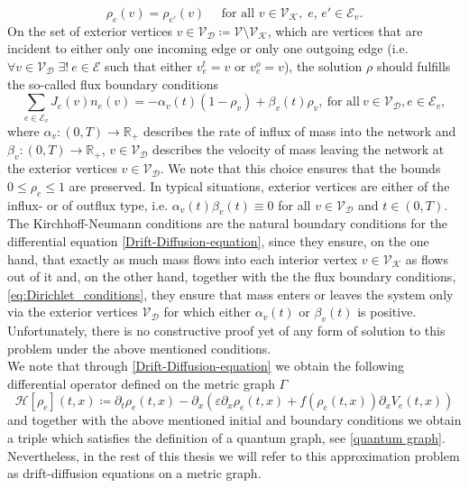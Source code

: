 \begin{equation}
    \label{continuous on vertices}
    \rho_e(v) = \rho_{e'}(v) \quad \text{ for all }v \in \mathcal{V}_\mathcal{K},\; e,\,e' \in \mathcal{E}_v.
\end{equation}
On the set of exterior vertices $v \in \mathcal{V}_\mathcal{D} \coloneqq \mathcal{V} \setminus \mathcal{V}_\mathcal{K}$, which are vertices that are incident to either only one incoming edge or only one outgoing edge (i.e. $\forall v \in \mathcal{V}_\mathcal{D} \; \exists! \ e \in \mathcal{E}$ such that either $v^{t}_{e} = v$ or $v^{o}_{e} = v$), the solution $\rho$ should fulfills the so-called flux boundary conditions
\begin{equation}
    \label{eq:Dirichlet_conditions}
    \sum_{e\in \mathcal{E}_v}J_e(v) n_e (v)=-\alpha_v(t) (1-\rho_v) + \beta_v(t) \rho_v,\ \text{for all}\ v \in \mathcal{V}_\mathcal{D}, e \in \mathcal{E}_v,
\end{equation}
where $\alpha_v \colon (0,T) \to \mathbb{R}_{+}$ describes the rate of influx of mass into the network and $\beta_v \colon (0,T) \to \mathbb{R}_{+}$, ${v \in \mathcal{V}_\mathcal{D}}$ describes the velocity of mass leaving the network at the exterior vertices $v \in \mathcal{V}_\mathcal{D}$. We note that this choice ensures that the bounds $0 \leq \rho_e \leq 1$ are preserved. In typical situations, exterior vertices are either of the influx- or of outflux type, i.e. $\alpha_v(t) \beta_v(t) \equiv 0$ for all $v \in \mathcal{V}_\mathcal{D}$ and $t \in (0,T)$. \\
The Kirchhoff-Neumann conditions are the natural boundary conditions for the differential equation \eqref{Drift-Diffusion-equation}, since they ensure, on the one hand, that exactly as much mass flows into each interior vertex $v \in \mathcal{V}_{\mathcal{K}}$ as flows out of it and, on the other hand, together with the the flux boundary conditions, \cref{eq:Dirichlet_conditions}, they ensure that mass enters or leaves the system only via the exterior vertices $\mathcal{V}_\mathcal{D}$ for which either $\alpha_v(t)$ or $\beta_v(t)$ is positive. \\

Unfortunately, there is no constructive proof yet of any form of solution to this problem under the above mentioned conditions. \\

We note that through \cref{Drift-Diffusion-equation} we obtain the following differential operator defined on the metric graph $\Gamma$
\begin{equation} 
    \label{eq:Hamiltonian}
    \mathcal{H} [\rho_e] (t,x) \coloneqq \partial_t \rho_e (t,x)  - \partial_x (\varepsilon \partial_x \rho_e (t,x) + f(\rho_e (t,x) ) \partial_x V_e (t,x))
\end{equation}
and together with the above mentioned initial and boundary conditions we obtain a triple which satisfies the definition of a quantum graph, see \cref{quantum graph}. Nevertheless, in the rest of this thesis we will refer to this approximation problem as drift-diffusion equations on a metric graph. 







